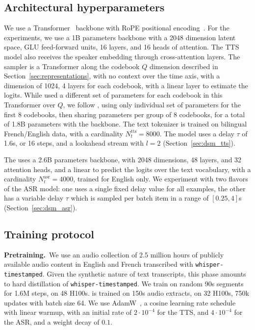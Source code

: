 \documentclass{article}
\begin{document}
\subsection{Architectural hyperparameters}
\label{sec:hyperparams}
We use a Transformer~\citep{attentionvaswani} backbone with RoPE positional encoding~\citep{su2024roformer}. For the \oursTTS{} experiments, we use a 1B parameters backbone with a 2048 dimension latent space, GLU feed-forward units, 16 layers, and 16 heads of attention.
The TTS model also receives the speaker embedding through cross-attention layers.
The sampler is a Transformer along the codebook $Q$ dimension described in Section~\ref{sec:representations}, with no context over the time axis, with a dimension of 1024, 4 layers for each codebook, with a linear layer to estimate the logits. While \citet{moshi} used a different set of parameters for each codebook in this Transformer over $Q$, we follow \citet{hibiki}, using only individual set of parameters for the first 8 codebooks, then sharing parameters per group of 8 codebooks, for a total of 1.8B parameters with the backbone.
The text tokenizer is trained on bilingual French/English data, with a cardinality $N_t^\text{tts}=8000$.
The model uses a delay $\tau$ of 1.6s, or 16 steps, and a lookahead stream with $l = 2$ (Section~\ref{sec:dsm_tts}).

The \oursASR{} uses a 2.6B parameters backbone, with 2048 dimensions, 48 layers, and 32 attention heads, and a linear to predict the logits over the text vocabulary, with a cardinality $N_t^\text{asr} = 4000$, trained for English only. We experiment with two flavors of the ASR model: one uses a single fixed delay value for all examples, the other has a variable delay $\tau$ which is sampled per batch item in a range of $[0.25, 4]$s (Section~\ref{sec:dsm_asr}).

\subsection{Training protocol}
\label{sec:training_protocol}
\textbf{Pretraining.}\
We use an audio collection of 2.5 million hours of publicly available audio content in English and French transcribed with \texttt{whisper-timestamped}. Given the synthetic nature of text transcripts, this phase amounts to hard distillation of \texttt{whisper-timestamped}. We train \oursASR{} on random 90s segments for 1.6M steps, on 48 H100s. %
\oursTTS{} is trained on 150s audio extracts, on 32 H100s, 750k updates with batch size 64.
We use AdamW~\citep{adamw}, a cosine learning rate schedule with linear warmup, with an initial rate of $2\cdot\mathrm{10}^{-4}$ for the TTS, and 
 $4\cdot\mathrm{10}^{-4}$ for the ASR, and a weight decay of $0.1$.
\end{document}
